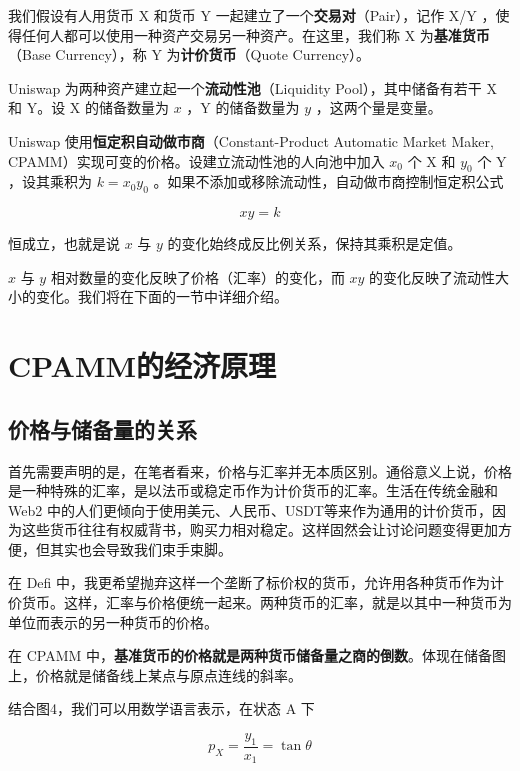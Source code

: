 \documentclass[12pt, a4paper, oneside]{ctexart}
\begin{document}
我们假设有人用货币 X 和货币 Y 一起建立了一个\textbf{交易对}（Pair），记作 X/Y ，使得任何人都可以使用一种资产交易另一种资产。在这里，我们称 X 为\textbf{基准货币}（Base Currency），称 Y 为\textbf{计价货币}（Quote Currency）。

Uniswap 为两种资产建立起一个\textbf{流动性池}（Liquidity Pool），其中储备有若干 X 和 Y。设 X 的储备数量为 $x$ ，Y 的储备数量为 $y$ ，这两个量是变量。

Uniswap 使用\textbf{恒定积自动做市商}（Constant-Product Automatic Market Maker, CPAMM）实现可变的价格。设建立流动性池的人向池中加入 $x_0$ 个 X 和 $y_0$ 个 Y ，设其乘积为 $k=x_0y_0$ 。如果不添加或移除流动性，自动做市商控制恒定积公式

\begin{equation}
    xy=k 
\end{equation}

\noindent 恒成立，也就是说 $x$ 与 $y$ 的变化始终成反比例关系，保持其乘积是定值。

$x$ 与 $y$ 相对数量的变化反映了价格（汇率）的变化，而 $xy$ 的变化反映了流动性大小的变化。我们将在下面的一节中详细介绍。

\section{CPAMM的经济原理}

\subsection{价格与储备量的关系}

首先需要声明的是，在笔者看来，价格与汇率并无本质区别。通俗意义上说，价格是一种特殊的汇率，是以法币或稳定币作为计价货币的汇率。生活在传统金融和 Web2 中的人们更倾向于使用美元、人民币、USDT等来作为通用的计价货币，因为这些货币往往有权威背书，购买力相对稳定。这样固然会让讨论问题变得更加方便，但其实也会导致我们束手束脚。

在 Defi 中，我更希望抛弃这样一个垄断了标价权的货币，允许用各种货币作为计价货币。这样，汇率与价格便统一起来。两种货币的汇率，就是以其中一种货币为单位而表示的另一种货币的价格。

在 CPAMM 中，\textbf{基准货币的价格就是两种货币储备量之商的倒数}。体现在储备图上，价格就是储备线上某点与原点连线的斜率。

结合图4，我们可以用数学语言表示，在状态 A 下

$$
p_X = \frac{y_1}{x_1} = \tan \theta
$$
\end{document}
